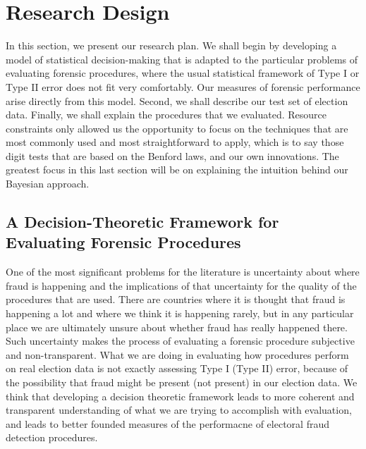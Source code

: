 \section{Research Design}

In this section, we present our research plan. We shall begin by developing a model of statistical decision-making that is adapted to the particular problems of evaluating forensic procedures, where the usual statistical framework of Type I or Type II error does not fit very comfortably. Our measures of forensic performance arise directly from this model.  Second, we shall describe our test set of election data. Finally, we shall explain the procedures that we evaluated. Resource constraints only allowed us the opportunity to focus on the techniques that are most commonly used and most straightforward to apply, which is to say those digit tests that are based on the Benford laws, and our own innovations.  The greatest focus in this last section will be on explaining the intuition behind our Bayesian approach.

\subsection{A Decision-Theoretic Framework for Evaluating Forensic Procedures}

One of the most significant problems for the literature is uncertainty about where fraud is happening and the implications of that uncertainty for the quality of the procedures that are used. There are countries where it is thought that fraud is happening a lot and where we think it is happening rarely, but in any particular place we are ultimately unsure about whether fraud has really happened there. Such uncertainty makes the process of evaluating a forensic procedure subjective and non-transparent. What we are doing in evaluating how procedures perform on real election data is not exactly assessing Type I (Type II) error, because of the possibility that fraud might be present (not present) in our election data. We think that developing a decision theoretic framework leads to more coherent and transparent understanding of what we are trying to accomplish with evaluation, and leads to better founded measures of the performacne of electoral fraud detection procedures.  

